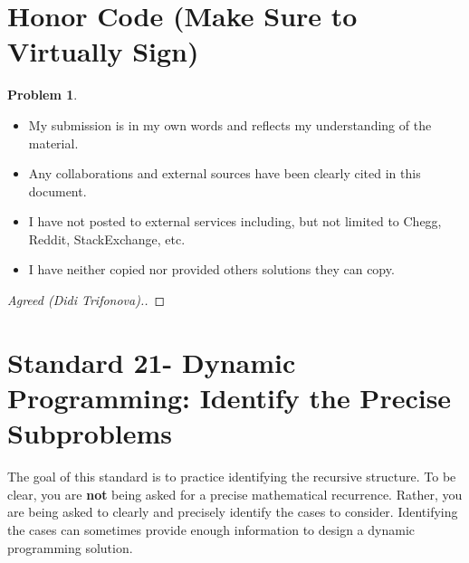 \documentclass[11pt]{article}
\theoremstyle{definition}
\theoremstyle{definition}
\newtheorem{required}{Problem}
\theoremstyle{definition}
\begin{document}
\section{Honor Code (Make Sure to Virtually Sign)} \label{HonorCode}

\begin{required}
\begin{itemize}
\item My submission is in my own words and reflects my understanding of the material.
\item Any collaborations and external sources have been clearly cited in this document.
\item I have not posted to external services including, but not limited to Chegg, Reddit, StackExchange, etc.
\item I have neither copied nor provided others solutions they can copy.
\end{itemize}

\end{required}

\begin{proof}[Agreed (Didi Trifonova).]
\end{proof}


\newpage
\section{Standard 21- Dynamic Programming: Identify the Precise Subproblems}

\noindent The goal of this standard is to practice identifying the recursive structure. To be clear, you are \textbf{not} being asked for a precise mathematical recurrence. Rather, you are being asked to clearly and precisely identify the cases to consider. Identifying the cases can sometimes provide enough information to design a dynamic programming solution.
\end{document}
